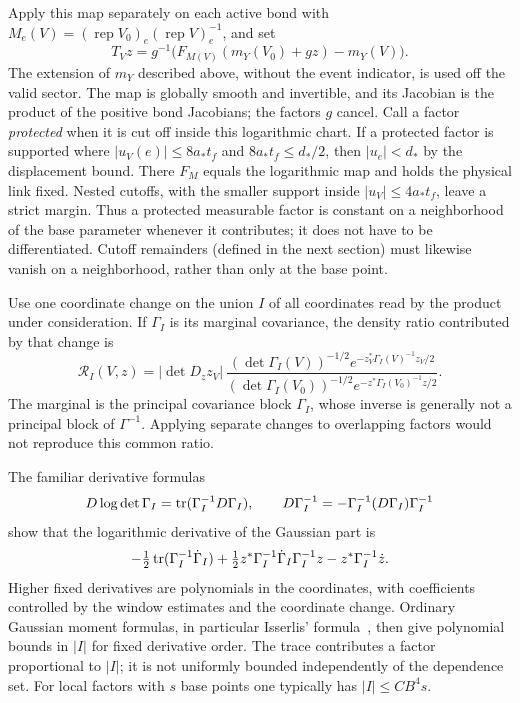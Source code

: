 Apply this map separately on each active bond with
$M_e(V)=(\operatorname{rep}V_0)_e(\operatorname{rep}V)_e^{-1}$, and set
\[
 T_Vz=g^{-1}\bigl(F_{M(V)}(m_Y(V_0)+gz)-m_Y(V)\bigr).
\]
The extension of $m_Y$ described above, without the event indicator, is used off the valid
sector. The map is globally smooth and invertible, and its Jacobian is
the product of the positive bond Jacobians; the factors $g$ cancel.
Call a factor \emph{protected} when it is cut off inside this logarithmic chart. If a protected factor is supported where $|u_V(e)|\le8a_*t_f$
and $8a_*t_f\le d_*/2$, then $|u_e|<d_*$ by the displacement bound.
There $F_M$ equals the logarithmic map and holds the physical link fixed.
Nested cutoffs, with the smaller support inside $|u_V|\le4a_*t_f$,
leave a strict margin. Thus a protected measurable factor is constant
on a neighborhood of the base parameter whenever it contributes; it
does not have to be differentiated. Cutoff remainders (defined in the next section) must likewise
vanish on a neighborhood, rather than only at the base point.

Use one coordinate change on the union $I$ of all coordinates read by the
product under consideration. If $\Gamma_I$ is its marginal covariance,
the density ratio contributed by that change is
\begin{equation}
 \mathcal R_I(V,z)=|\det D_z z_V|\,
 \frac{(\det\Gamma_I(V))^{-1/2}
        e^{-z_V^*\Gamma_I(V)^{-1}z_V/2}}
      {(\det\Gamma_I(V_0))^{-1/2}
        e^{-z^*\Gamma_I(V_0)^{-1}z/2}}.
 \label{ch06:density-ratio}
\end{equation}
The marginal is the principal covariance block $\Gamma_I$, whose inverse
is generally not a principal block of $\Gamma^{-1}$. Applying separate
changes to overlapping factors would not reproduce this common ratio.

The familiar derivative formulas
\[
 D\log\det\Gamma_I=\operatorname{tr}(\Gamma_I^{-1}D\Gamma_I),\qquad
 D\Gamma_I^{-1}=-\Gamma_I^{-1}(D\Gamma_I)\Gamma_I^{-1}
\]
show that the logarithmic derivative of the Gaussian part is
\[
 -\tfrac12\operatorname{tr}(\Gamma_I^{-1}\dot\Gamma_I)
 +\tfrac12z^*\Gamma_I^{-1}\dot\Gamma_I\Gamma_I^{-1}z
 -z^*\Gamma_I^{-1}\dot z.
\]
Higher fixed derivatives are polynomials in the coordinates, with
coefficients controlled by the window estimates and the coordinate
change. Ordinary Gaussian moment formulas, in particular
Isserlis' formula~\cite{Isserlis1918}, then give polynomial bounds in $|I|$
for fixed derivative order. The trace contributes a factor proportional to
$|I|$; it is not uniformly bounded independently of the dependence set.
For local factors with $s$ base points one typically has $|I|\le CB^4s$.

